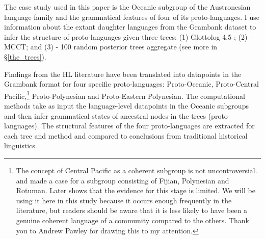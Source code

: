 \documentclass[12pt,letterpaper]{article}
\begin{document}


The case study used in this paper is the Oceanic subgroup of the Austronesian language family and the grammatical features of four of its proto-languages. I use information about the extant daughter languages from the Grambank dataset \citep{grambank_release} to infer the structure of proto-languages given three trees: (1) Glottolog 4.5 \citep{glottolog4_5}; (2) \citet{grayetal_2009} - MCCT; and (3) \citet{grayetal_2009} - 100 random posterior trees aggregate (see more in §\ref{the_trees}). 

Findings from the HL literature have been translated into datapoints in the Grambank format for four specific proto-languages: Proto-Oceanic, Proto-Central Pacific,\footnote{The concept of Central Pacific as a coherent subgroup is not uncontroversial. \citet{grace1958position} and \citet{pawley1972internal} made a case for a subgroup consisting of Fijian, Polynesian and Rotuman. Later \citet{geraghty1996} shows that the evidence for this stage is limited. We will be using it here in this study because it occurs enough frequently in the literature, but readers should be aware that it is less likely to have been a genuine coherent language of a community compared to the others. Thank you to Andrew Pawley for drawing this to my attention.} Proto-Polynesian and Proto-Eastern Polynesian. The computational methods take as input the language-level datapoints in the Oceanic subgroups and then infer grammatical states of ancestral nodes in the trees (proto-languages). The structural features of the four proto-languages are extracted for each tree and method and compared to conclusions from traditional historical linguistics. 
\end{document}
